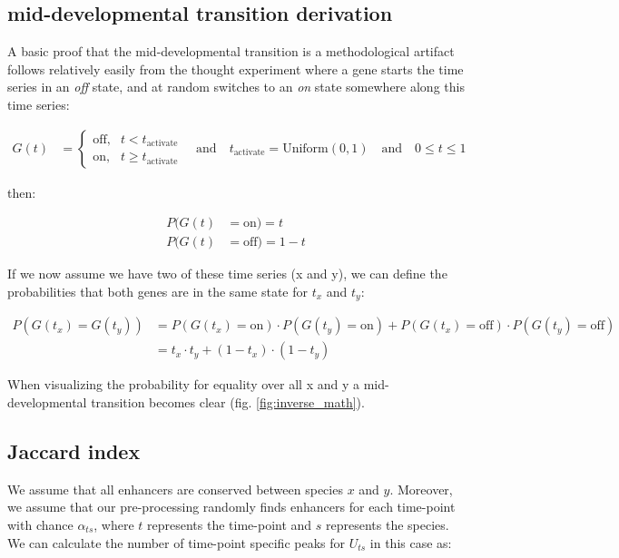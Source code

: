 \subsection{mid-developmental transition derivation}\label{subsection:middevelopmenttransition}

A basic proof that the mid-developmental transition is a methodological artifact follows relatively easily from the thought experiment where a gene starts the time series in an \textit{off} state, and at random switches to an \textit{on} state somewhere along this time series:

\begin{align*}    
    G(t) & = \begin{cases} \text{off},& t < t_{\text{activate}} \\ \text{on},& t \geq t_{\text{activate}} \end{cases} \quad \textrm{and} \quad
    t_{\text{activate}} = \text{Uniform}(0, 1) \quad \textrm{and} \quad
    0 \leq t \leq 1
\end{align*}

then:

\begin{align*}
    P(G(t) & = \text{on}) = t \\
    P(G(t) & = \text{off}) = 1 - t
\end{align*}

If we now assume we have two of these time series (x and y), we can define the probabilities that both genes are in the same state for $t_x$ and $t_y$:

\begin{align*}
    P(G(t_x) = G(t_y)) & = P(G(t_x) = \text{on}) \cdot P(G(t_y) = \text{on}) + P(G(t_x) = \text{off}) \cdot P(G(t_y) = \text{off}) \\
    & = t_x \cdot t_y + (1 - t_x) \cdot (1-t_y)
\end{align*}

When visualizing the probability for equality over all x and y a mid-developmental transition becomes clear (fig. \ref{fig:inverse_math}).

\subsection{Jaccard index}\label{subsection:flypeaks}

We assume that all enhancers are conserved between species $x$ and $y$. Moreover, we assume that our pre-processing randomly finds enhancers for each time-point with chance $\alpha_{ts}$, where $t$ represents the time-point and $s$ represents the species. We can calculate the number of time-point specific peaks for $U_{ts}$ in this case as:

